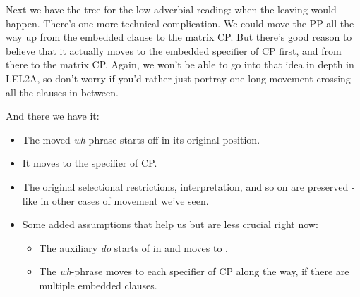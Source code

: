 \documentclass{article}
\begin{document}
Next we have the tree for the low adverbial reading: when the leaving would happen. There's one more technical complication. We could move the PP all the way up from the embedded clause to the matrix CP. But there's good reason to believe that it actually moves to the embedded specifier of CP first, and from there to the matrix CP. Again, we won't be able to go into that idea in depth in LEL2A, so don't worry if you'd rather just portray one long movement crossing all the clauses in between.
\z

And there we have it:
\begin{itemize}
    \item The moved \emph{wh}-phrase starts off in its original position.
    \item It moves to the specifier of CP.
    \item The original selectional restrictions, interpretation, and so on are preserved - like in other cases of movement we've seen.
    \item Some added assumptions that help us but are less crucial right now:
        \begin{itemize}
            \item The auxiliary \emph{do} starts of in  and moves to .
            \item The \emph{wh}-phrase moves to each specifier of CP along the way, if there are multiple embedded clauses.
        \end{itemize}
\end{itemize}
\end{document}

